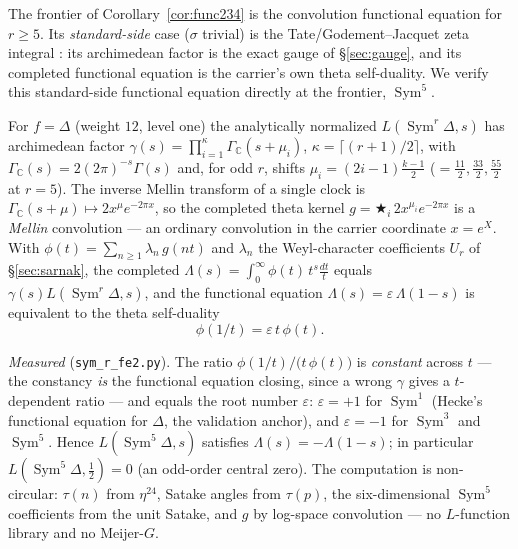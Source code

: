 \documentclass[11pt]{article}
\theoremstyle{definition}
\newcommand{\Sym}{\operatorname{Sym}}
\begin{document}
The frontier of Corollary~\ref{cor:func234} is the convolution functional equation for $r\ge5$. Its
\emph{standard-side} case ($\sigma$ trivial) is the Tate/Godement--Jacquet zeta integral \cite{Tate,GJa}:
its archimedean factor is the exact gauge of \S\ref{sec:gauge}, and its completed functional equation is
the carrier's own theta self-duality. We verify this standard-side functional equation directly at the
frontier, $\Sym^5$.

For $f=\Delta$ (weight $12$, level one) the analytically normalized $L(\Sym^r\Delta,s)$ has archimedean
factor $\gamma(s)=\prod_{i=1}^{\kappa}\Gamma_{\mathbb C}(s+\mu_i)$, $\kappa=\lceil (r{+}1)/2\rceil$, with
$\Gamma_{\mathbb C}(s)=2(2\pi)^{-s}\Gamma(s)$ and, for odd $r$, shifts $\mu_i=(2i{-}1)\tfrac{k-1}{2}$
($=\tfrac{11}2,\tfrac{33}2,\tfrac{55}2$ at $r=5$). The inverse Mellin transform of a single clock is
$\Gamma_{\mathbb C}(s+\mu)\!\mapsto\! 2x^{\mu}e^{-2\pi x}$, so the completed theta kernel
$g=\bigstar_{i}\,2x^{\mu_i}e^{-2\pi x}$ is a \emph{Mellin} convolution --- an ordinary convolution in the
carrier coordinate $x=e^{X}$. With $\phi(t)=\sum_{n\ge1}\lambda_n\,g(nt)$ and $\lambda_n$ the
Weyl-character coefficients $U_r$ of \S\ref{sec:sarnak}, the completed $\Lambda(s)=\int_0^\infty\phi(t)\,
t^{s}\tfrac{dt}{t}$ equals $\gamma(s)L(\Sym^r\Delta,s)$, and the functional equation
$\Lambda(s)=\varepsilon\,\Lambda(1-s)$ is equivalent to the theta self-duality
\begin{equation}\label{eq:thetaselfdual}
  \phi(1/t)=\varepsilon\,t\,\phi(t).
\end{equation}

\emph{Measured} (\texttt{sym\_r\_fe2.py}). The ratio $\phi(1/t)/\bigl(t\,\phi(t)\bigr)$ is \emph{constant}
across $t$ --- the constancy \emph{is} the functional equation closing, since a wrong $\gamma$ gives a
$t$-dependent ratio --- and equals the root number $\varepsilon$: $\varepsilon=+1$ for $\Sym^1$ (Hecke's
functional equation for $\Delta$, the validation anchor), and $\varepsilon=-1$ for $\Sym^3$ and $\Sym^5$.
Hence $L(\Sym^5\Delta,s)$ satisfies $\Lambda(s)=-\Lambda(1-s)$; in particular $L(\Sym^5\Delta,\tfrac12)=0$
(an odd-order central zero). The computation is non-circular: $\tau(n)$ from $\eta^{24}$, Satake angles
from $\tau(p)$, the six-dimensional $\Sym^5$ coefficients from the unit Satake, and $g$ by log-space
convolution --- no $L$-function library and no Meijer-$G$.
\end{document}
